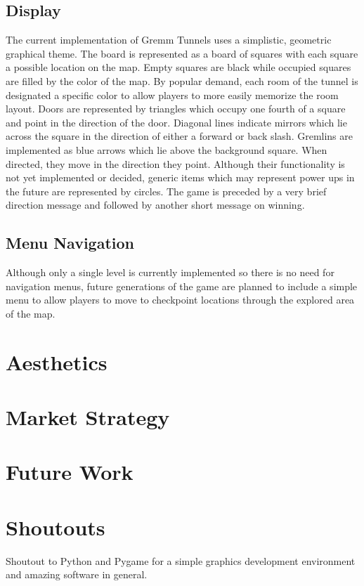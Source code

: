 \documentclass{scrreprt}
\begin{document}
		\section{Display}
			The current implementation of Gremm Tunnels uses a simplistic, geometric graphical theme. The board is represented as a board of squares with each square a possible location on the map. Empty squares are black while occupied squares are filled by the color of the map. By popular demand, each room of the tunnel is designated a specific color to allow players to more easily memorize the room layout. Doors are represented by triangles which occupy one fourth of a square and point in the direction of the door. Diagonal lines indicate mirrors which lie across the square in the direction of either a forward or back slash. Gremlins are implemented as blue arrows which lie above the background square. When directed, they move in the direction they point. Although their functionality is not yet implemented or decided, generic items which may represent power ups in the future are represented by circles. The game is preceded by a very brief direction message and followed by another short message on winning.
		
		\section{Menu Navigation}
			Although only a single level is currently implemented so there is no need for navigation menus, future generations of the game are planned to include a simple menu to allow players to move to checkpoint locations through the explored area of the map. 
		
	\chapter{Aesthetics}
		
	\chapter{Market Strategy}
		
	\chapter{Future Work}
		
	\chapter{Shoutouts}
		Shoutout to Python and Pygame for a simple graphics development environment and amazing software in general.
		
\end{document}
